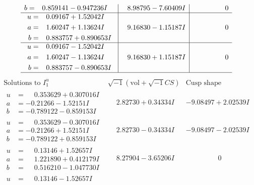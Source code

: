 \documentclass[1p]{elsarticle_modified}
\theoremstyle{definition}
\newcommand{\I}{\sqrt{-1}}
\begin{document}
$$\begin{array}{c|c|c}
\begin{aligned}
b &= \phantom{-}0.859141 - 0.947236 I\end{aligned}
 & \phantom{-}8.98795 - 7.60409 I & \phantom{-0.000000 } 0 \\ \hline\begin{aligned}
u &= \phantom{-}0.09167 + 1.52042 I \\
a &= \phantom{-}1.60247 + 1.13624 I \\
b &= \phantom{-}0.883757 + 0.890653 I\end{aligned}
 & \phantom{-}9.16830 - 1.15187 I & \phantom{-0.000000 } 0 \\ \hline\begin{aligned}
u &= \phantom{-}0.09167 - 1.52042 I \\
a &= \phantom{-}1.60247 - 1.13624 I \\
b &= \phantom{-}0.883757 - 0.890653 I\end{aligned}
 & \phantom{-}9.16830 + 1.15187 I & \phantom{-0.000000 } 0\\
 \hline 
 \end{array}$$\newpage$$\begin{array}{c|c|c}  
\text{Solutions to }I^u_{1}& \I (\text{vol} + \sqrt{-1}CS) & \text{Cusp shape}\\
 \hline 
\begin{aligned}
u &= \phantom{-}0.353629 + 0.307016 I \\
a &= -0.21266 - 1.52151 I \\
b &= -0.789122 - 0.859153 I\end{aligned}
 & \phantom{-}2.82730 + 0.34334 I & -9.08497 + 2.02539 I \\ \hline\begin{aligned}
u &= \phantom{-}0.353629 - 0.307016 I \\
a &= -0.21266 + 1.52151 I \\
b &= -0.789122 + 0.859153 I\end{aligned}
 & \phantom{-}2.82730 - 0.34334 I & -9.08497 - 2.02539 I \\ \hline\begin{aligned}
u &= \phantom{-}0.13146 + 1.52657 I \\
a &= \phantom{-}1.221890 + 0.412179 I \\
b &= \phantom{-}0.516210 - 1.047730 I\end{aligned}
 & \phantom{-}8.27904 - 3.65206 I & \phantom{-0.000000 } 0 \\ \hline\begin{aligned}
u &= \phantom{-}0.13146 - 1.52657 I \\

\end{aligned}
\end{array}$$
\end{document}

